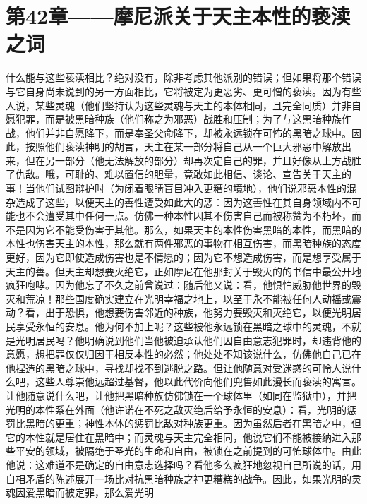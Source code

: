 
\section{第42章——摩尼派关于天主本性的亵渎之词}

什么能与这些亵渎相比？绝对没有，除非考虑其他派别的错误；但如果将那个错误与它自身尚未说到的另一方面相比，它将被定为更恶劣、更可憎的亵渎。因为有些人说，某些灵魂（他们坚持认为这些灵魂与天主的本体相同，且完全同质）并非自愿犯罪，而是被黑暗种族（他们称之为邪恶）战胜和压制；为了与这黑暗种族作战，他们并非自愿降下，而是奉圣父命降下，却被永远锁在可怖的黑暗之球中。因此，按照他们亵渎神明的胡言，天主在某一部分将自己从一个巨大邪恶中解放出来，但在另一部分（他无法解放的部分）却再次定自己的罪，并且好像从上方战胜了仇敌。哦，可耻的、难以置信的胆量，竟敢如此相信、谈论、宣告关于天主的事！当他们试图辩护时（为闭着眼睛盲目冲入更糟的境地），他们说邪恶本性的混杂造成了这些，以便天主的善性遭受如此大的恶：因为这善性在其自身领域内不可能也不会遭受其中任何一点。仿佛一种本性因其不伤害自己而被称赞为不朽坏，而不是因为它不能受伤害于其他。那么，如果天主的本性伤害黑暗的本性，而黑暗的本性也伤害天主的本性，那么就有两件邪恶的事物在相互伤害，而黑暗种族的态度更好，因为它即使造成伤害也是不情愿的；因为它不想造成伤害，而是想享受属于天主的善。但天主却想要灭绝它，正如摩尼在他那封关于毁灭的的书信中最公开地疯狂咆哮。因为他忘了不久之前曾说过：随后他又说：看，他惧怕威胁他世界的毁灭和荒凉！那些国度确实建立在光明幸福之地上，以至于永不能被任何人动摇或震动？看，出于恐惧，他想要伤害邻近的种族，他努力要毁灭和灭绝它，以便光明居民享受永恒的安息。他为何不加上呢？这些被他永远锁在黑暗之球中的灵魂，不就是光明居民吗？他明确说到他们当他被迫承认他们因自由意志犯罪时，却违背他的意愿，想把罪仅仅归因于相反本性的必然；他处处不知该说什么，仿佛他自己已在他捏造的黑暗之球中，寻找却找不到逃脱之路。但让他随意对受迷惑的可怜人说什么吧，这些人尊崇他远超过基督，他以此代价向他们兜售如此漫长而亵渎的寓言。让他随意说什么吧，让他把黑暗种族仿佛锁在一个球体里（如同在监狱中），并把光明的本性系在外面（他许诺在不死之敌灭绝后给予永恒的安息）：看，光明的惩罚比黑暗的更重；神性本体的惩罚比敌对种族更重。因为虽然后者在黑暗之中，但它的本性就是居住在黑暗中；而灵魂与天主完全相同，他说它们不能被接纳进入那些平安的领域，被隔绝于圣光的生命和自由，被锁在之前提到的可怖球体中。由此他说：这难道不是确定的自由意志选择吗？看他多么疯狂地忽视自己所说的话，用自相矛盾的陈述展开一场比对抗黑暗种族之神更糟糕的战争。因此，如果光明的灵魂因爱黑暗而被定罪，那么爱光明